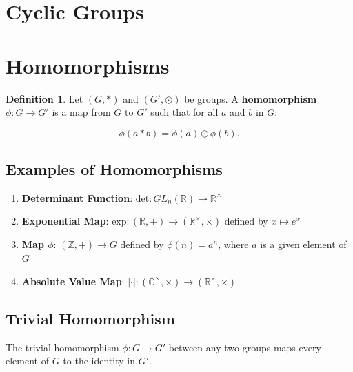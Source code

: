 \documentclass[
]{book}
\providecommand{\tightlist}{%
  \setlength{\itemsep}{0pt}\setlength{\parskip}{0pt}}
\theoremstyle{definition}
\newtheorem{definition}{Definition}[chapter]
\theoremstyle{definition}
\theoremstyle{definition}
\theoremstyle{definition}
\theoremstyle{remark}
\begin{document}
\hypertarget{cyclic-groups}{%
\section{Cyclic Groups}\label{cyclic-groups}}

\hypertarget{homomorphisms}{%
\section{Homomorphisms}\label{homomorphisms}}

\begin{definition}
\protect\hypertarget{def:unnamed-chunk-14}{}\label{def:unnamed-chunk-14}Let \((G, *)\) and \((G', \odot)\) be groups. A \textbf{homomorphism} \(\phi: G \rightarrow G'\) is a map from \(G\) to \(G'\) such that for all \(a\) and \(b\) in \(G\):

\begin{equation}
    \phi(a * b) = \phi(a) \odot \phi(b).
\end{equation}
\end{definition}

\hypertarget{examples-of-homomorphisms}{%
\subsection{Examples of Homomorphisms}\label{examples-of-homomorphisms}}

\begin{enumerate}
\def\labelenumi{\arabic{enumi}.}
\tightlist
\item
  \textbf{Determinant Function}: \(\text{det}: GL_n(\mathbb{R}) \to \mathbb{R}^\times\)
\item
  \textbf{Exponential Map}: \(\text{exp}: (\mathbb{R}, +) \to (\mathbb{R}^\times, \times)\) defined by \(x \mapsto e^x\)
\item
  \textbf{Map \(\phi\)}: \((\mathbb{Z}, +) \to G\) defined by \(\phi(n) = a^n\), where \(a\) is a given element of \(G\)
\item
  \textbf{Absolute Value Map}: \(|\cdot| : (\mathbb{C}^\times, \times) \to (\mathbb{R}^\times, \times)\)
\end{enumerate}

\hypertarget{trivial-homomorphism}{%
\subsection{Trivial Homomorphism}\label{trivial-homomorphism}}

The trivial homomorphism \(\phi: G \rightarrow G'\) between any two groups maps every element of \(G\) to the identity in \(G'\).
\end{document}
